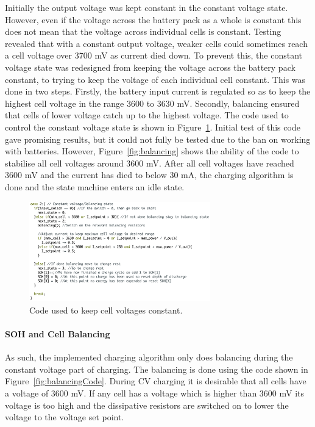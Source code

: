 \documentclass[a4paper]{article}
\begin{document}
Initially the output voltage was kept constant in the constant voltage 
state. However, even if the voltage across the battery pack as a whole is 
constant this does not mean that the voltage across individual cells is constant. 
Testing revealed that with a constant output voltage, weaker cells could sometimes 
reach a cell voltage over 3700 mV as current died down. To prevent this, the 
constant voltage state was redesigned from keeping the voltage across the battery 
pack constant, to trying to keep the voltage of each individual cell constant. 
This was done in two steps. Firstly, the battery input current is regulated so 
as to keep the highest cell voltage in the range 3600 to 3630 mV. Secondly, 
balancing ensured that cells of lower voltage catch up to the highest voltage. 
The code used to control the constant voltage state is shown in 
Figure~\ref{fig:Constant_Voltage}. Initial test of this code gave promising 
results, but it could not fully be tested due to the ban on working with 
batteries. However, Figure~\ref{fig:balancing} shows the ability of the code 
to stabilise all cell voltages around 3600 mV. After all cell voltages have 
reached 3600 mV and the current has died to below 30 mA, the charging algorithm 
is done and the state machine enters an idle state. 

\begin{figure}[H]
    \centering
    \includegraphics[width = 0.7\textwidth]{Constant_voltage.png}
    \caption{Code used to keep cell voltages constant.}
    \vspace{-10pt}
    \label{fig:Constant_Voltage}
\end{figure}

\paragraph*{SOH and Cell Balancing}
As such, the 
implemented charging algorithm only does balancing during the constant 
voltage part of charging. The balancing is done using the code shown in 
Figure~\ref{fig:balancingCode}. During CV charging it is desirable that all cells have a voltage 
of 3600 mV. If any cell has a voltage which is higher than 3600 mV its 
voltage is too high and the dissipative resistors are switched on to lower 
the voltage to the voltage set point. 
\end{document}
